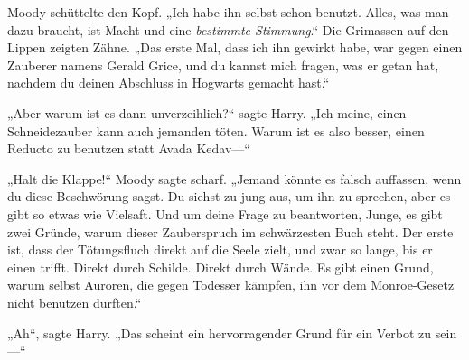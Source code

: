 Moody schüttelte den Kopf. „Ich habe ihn selbst schon benutzt. Alles, was man dazu braucht, ist Macht und eine \emph{bestimmte Stimmung}.“ Die Grimassen auf den Lippen zeigten Zähne. „Das erste Mal, dass ich ihn gewirkt habe, war gegen einen Zauberer namens Gerald Grice, und du kannst mich fragen, was er getan hat, nachdem du deinen Abschluss in Hogwarts gemacht hast.“

„Aber warum ist es dann unverzeihlich?“ sagte Harry. „Ich meine, einen Schneidezauber kann auch jemanden töten. Warum ist es also besser, einen Reducto zu benutzen statt Avada Kedav—“

„Halt die Klappe!“ Moody sagte scharf. „Jemand könnte es falsch auffassen, wenn du diese Beschwörung sagst. Du siehst zu jung aus, um ihn zu sprechen, aber es gibt so etwas wie Vielsaft. Und um deine Frage zu beantworten, Junge, es gibt zwei Gründe, warum dieser Zauberspruch im schwärzesten Buch steht. Der erste ist, dass der Tötungsfluch direkt auf die Seele zielt, und zwar so lange, bis er einen trifft. Direkt durch Schilde. Direkt durch Wände. Es gibt einen Grund, warum selbst Auroren, die gegen Todesser kämpfen, ihn vor dem Monroe-Gesetz nicht benutzen durften.“

„Ah“, sagte Harry. „Das scheint ein hervorragender Grund für ein Verbot zu sein—“

